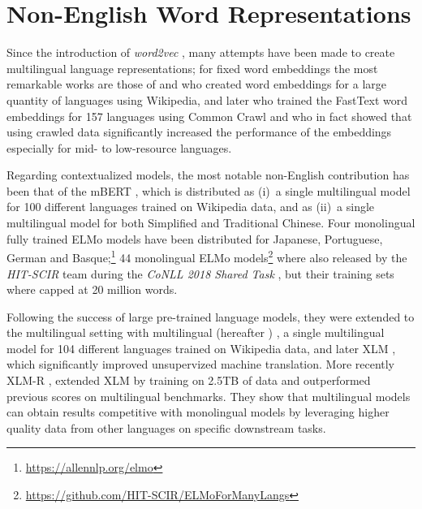 \section{Non-English Word Representations}

Since the introduction of \emph{word2vec} \citep{mikolov-etal-2013-distributed}, many attempts have been made to create multilingual language representations; for fixed word embeddings the most remarkable works are those of \citep{al-rfou-etal-2013-polyglot} and \citep{bojanowski-etal-2017-enriching} who created word embeddings for a large quantity of languages using Wikipedia, and later \citep{grave-etal-2018-learning} who trained the FastText word embeddings for 157 languages using Common Crawl and who in fact showed that using crawled data significantly increased the performance of the embeddings especially for mid- to low-resource languages.

Regarding contextualized models, the most notable non-English contribution has been that of the mBERT \citep{devlin-etal-2019-bert}, which is distributed as (i)~a single multilingual model for 100 different languages trained on Wikipedia data, and as (ii)~a single multilingual model for both Simplified and Traditional Chinese. Four monolingual fully trained ELMo models have been distributed for Japanese, Portuguese, German and Basque;\footnote{\url{https://allennlp.org/elmo}} 44 monolingual ELMo models\footnote{\url{https://github.com/HIT-SCIR/ELMoForManyLangs}} where also released by the \emph{HIT-SCIR} team \citep{che-etal-2018-towards} during the \emph{CoNLL 2018 Shared Task} \citep{zeman-etal-2018-conll}, but their training sets where capped at 20 million words.

Following the success of large pre-trained language models, they were extended to the multilingual setting with multilingual \bert (hereafter \mbert) \citep{devlin-etal-2019-bert}, a single multilingual model for 104 different languages trained on Wikipedia data, and later XLM \citep{conneau-lample-2019-cross}, which significantly improved unsupervized machine translation. More recently XLM-R \citep{conneau-etal-2020-unsupervised}, extended XLM by training on 2.5TB of data and outperformed previous scores on multilingual benchmarks. They show that multilingual models can obtain results competitive with monolingual models by leveraging higher quality data from other languages on specific downstream tasks.

